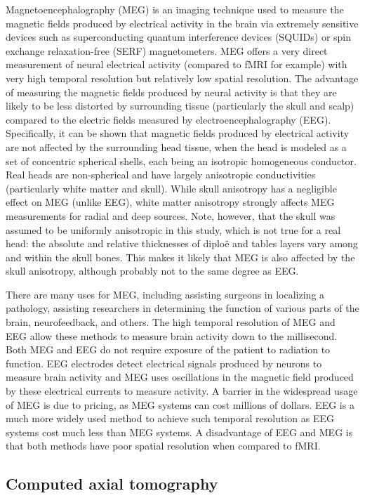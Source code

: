 Magnetoencephalography (MEG) is an imaging technique used to measure the magnetic fields produced by electrical activity in the brain via extremely sensitive devices such as superconducting quantum interference devices (SQUIDs) or spin exchange relaxation-free (SERF) magnetometers. MEG offers a very direct measurement of neural electrical activity (compared to fMRI for example) with very high temporal resolution but relatively low spatial resolution. The advantage of measuring the magnetic fields produced by neural activity is that they are likely to be less distorted by surrounding tissue (particularly the skull and scalp) compared to the electric fields measured by electroencephalography (EEG). Specifically, it can be shown that magnetic fields produced by electrical activity are not affected by the surrounding head tissue, when the head is modeled as a set of concentric spherical shells, each being an isotropic homogeneous conductor. Real heads are non-spherical and have largely anisotropic conductivities (particularly white matter and skull). While skull anisotropy has a negligible effect on MEG (unlike EEG), white matter anisotropy strongly affects MEG measurements for radial and deep sources. Note, however, that the skull was assumed to be uniformly anisotropic in this study, which is not true for a real head: the absolute and relative thicknesses of diploë and tables layers vary among and within the skull bones. This makes it likely that MEG is also affected by the skull anisotropy, although probably not to the same degree as EEG.

There are many uses for MEG, including assisting surgeons in localizing a pathology, assisting researchers in determining the function of various parts of the brain, neurofeedback, and others.
The high temporal resolution of MEG and EEG allow these methods to measure brain activity down to the millisecond. Both MEG and EEG do not require exposure of the patient to radiation to function. EEG electrodes detect electrical signals produced by neurons to measure brain activity and MEG uses oscillations in the magnetic field produced by these electrical currents to measure activity. A barrier in the widespread usage of MEG is due to pricing, as MEG systems can cost millions of dollars. EEG is a much more widely used method to achieve such temporal resolution as EEG systems cost much less than MEG systems. A disadvantage of EEG and MEG is that both methods have poor spatial resolution when compared to fMRI.

\hypertarget{computed-axial-tomography}{%
\subsection{Computed axial tomography}\label{computed-axial-tomography}}

